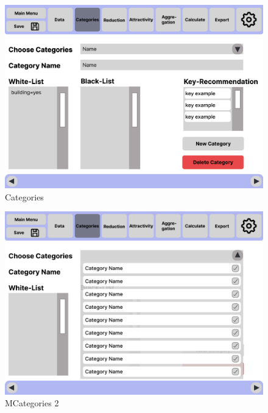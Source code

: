 \documentclass[parskip=full]{scrartcl} %
\begin{document}
\begin{figure}
    \centering
    \includegraphics[width=1\textwidth]{pictures/Categories.png}
    \caption{Categories}
\end{figure}

\begin{figure}
    \centering
    \includegraphics[width=1\textwidth]{pictures/Categories 2.png}
    \caption{MCategories 2}
\end{figure}
\end{document}
